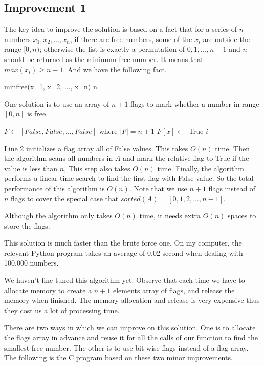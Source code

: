 \documentclass[UTF8]{article}
\begin{document}
\subsection{Improvement 1}
The key idea to improve the solution is based on a fact that for a
series of $n$ numbers $x_1, x_2, ..., x_n$, if there are free numbers,
some of the $x_i$ are outside the range $[0, n)$; otherwise the list is
exactly a permutation of $0, 1, ..., n-1$ and $n$ should be
returned as the minimum free number. It means that
$max(x_i) \geq n-1$. And we have the following fact.

\be
minfree(x_1, x_2, ..., x_n) \leq n
\label{min-free}
\ee

One solution is to use an array of $n+1$ flags to mark whether a number
in range $[0, n]$ is free.

\begin{algorithmic}[1]
  \State $F \gets [False, False, ..., False]$ where $|F| = n+1$
      \State $F[x] \gets$ True
    \EndIf
  \EndFor
      \State \Return $i$
    \EndIf
  \EndFor
\EndFunction
\end{algorithmic}

Line 2 initializes a flag array all of False values. This takes
$O(n)$ time. Then the algorithm scans all numbers in $A$ and mark
the relative flag to True if the value is less than $n$, This
step also takes $O(n)$ time. Finally, the algorithm performs a
linear time search to find the first flag with False value.
So the total performance of this algorithm is $O(n)$. Note that
we use $n+1$ flags instead of $n$ flags to cover the special case
that $sorted(A) = [0, 1, 2, ..., n-1]$.

Although the algorithm only takes $O(n)$ time, it needs extra
$O(n)$ spaces to store the flags.

This solution is much faster than the brute force one. On my
computer, the relevant Python program takes
an average of 0.02 second when dealing with 100,000 numbers.

We haven't fine tuned this algorithm yet. Observe that each time
we have to allocate memory to create a $n+1$ elements array of
flags, and release the memory when finished.
The memory allocation and release is very
expensive thus they cost us a lot of processing time.

There are two ways in which we can improve on
this solution. One is to allocate the flags array in advance
and reuse it for all the calls of our function to find the smallest free
number. The other is to use bit-wise flags instead of a flag
array. The following is the C program based on these two
minor improvements.
\end{document}
